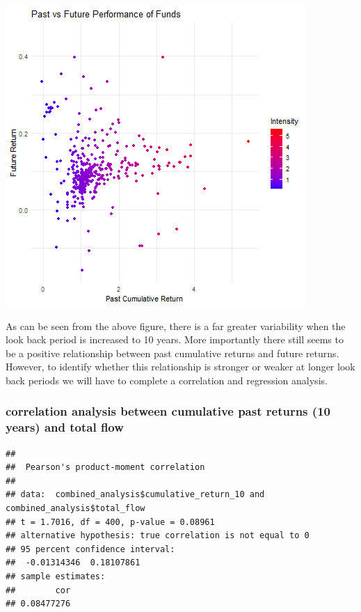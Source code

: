 \documentclass[11pt,preprint, authoryear]{elsarticle}
\let\origfigure\figure
\let\endorigfigure\endfigure
\renewenvironment{figure}[1][2] {
    \expandafter\origfigure\expandafter[H]
} {
    \endorigfigure
}
\numberwithin{equation}{section}
\numberwithin{figure}{section}
\numberwithin{table}{section}
\begin{document}
\begin{figure}[H]

{\centering \includegraphics{Question-4_files/figure-latex/Figure 2-1} 

}

\caption{10 year look back scatter plot \label{Figure2}}\label{fig:Figure 2}
\end{figure}

As can be seen from the above figure, there is a far greater variability
when the look back period is increased to 10 years. More importantly
there still seems to be a positive relationship between past cumulative
returns and future returns. However, to identify whether this
relationship is stronger or weaker at longer look back periods we will
have to complete a correlation and regression analysis.

\hypertarget{correlation-analysis-between-cumulative-past-returns-10-years-and-total-flow}{%
\subsubsection{correlation analysis between cumulative past returns (10
years) and total
flow}\label{correlation-analysis-between-cumulative-past-returns-10-years-and-total-flow}}

\begin{verbatim}
## 
##  Pearson's product-moment correlation
## 
## data:  combined_analysis$cumulative_return_10 and combined_analysis$total_flow
## t = 1.7016, df = 400, p-value = 0.08961
## alternative hypothesis: true correlation is not equal to 0
## 95 percent confidence interval:
##  -0.01314346  0.18107861
## sample estimates:
##        cor 
## 0.08477276
\end{verbatim}
\end{document}
